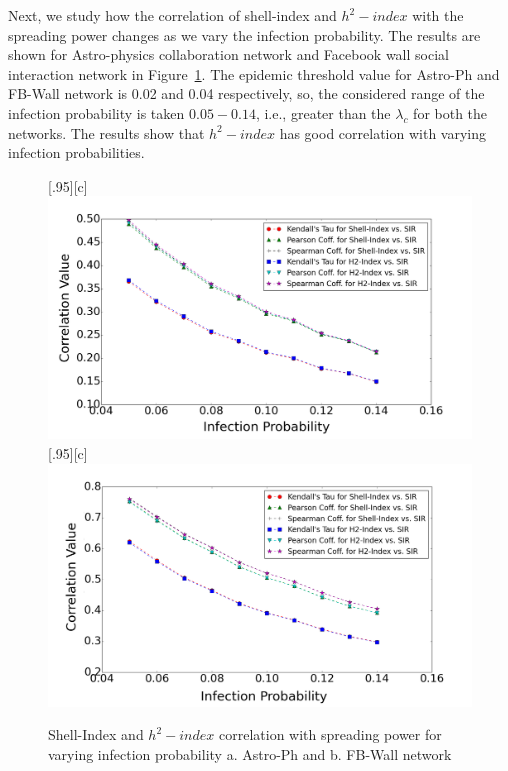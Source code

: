 \documentclass[conference]{IEEEtran}
\begin{document}
Next, we study how the correlation of shell-index and $h^2-index$ with the spreading power changes as we vary the infection probability. The results are shown for Astro-physics collaboration network and Facebook wall social interaction network in Figure~\ref{fig2}. The epidemic threshold value for Astro-Ph and FB-Wall network is 0.02 and 0.04 respectively, so, the considered range of the infection probability is taken $0.05-0.14$, i.e., greater than the $\lambda_c$ for both the networks. The results show that $h^2-index$ has good correlation with varying infection probabilities. 

\begin{figure}[htp]
  \centering
  [.95\linewidth][c]{%
    \includegraphics[width=.95\linewidth]{images/astroph1.png}}\quad
  [.95\linewidth][c]{%
    \includegraphics[width=.95\linewidth]{images/fbwall1.png}}
  \caption{Shell-Index and $h^2-index$ correlation with spreading power for varying infection probability a. Astro-Ph and b. FB-Wall network}
  \label{fig2}
\end{figure}
\end{document}
